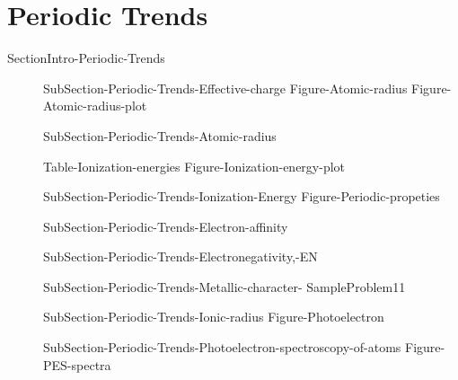 \documentclass[main.tex]{subfiles}
\begin{document}
\section{Periodic Trends}{SectionIntro-Periodic-Trends}
\sloppy
\begin{description}
\item[] {SubSection-Periodic-Trends-Effective-charge}
   {Figure-Atomic-radius}
{Figure-Atomic-radius-plot}

\item[] {SubSection-Periodic-Trends-Atomic-radius}

{Table-Ionization-energies}\newpage
{Figure-Ionization-energy-plot}
\item[] {SubSection-Periodic-Trends-Ionization-Energy}
  {Figure-Periodic-propeties}

\item[] {SubSection-Periodic-Trends-Electron-affinity}

 
\item[] {SubSection-Periodic-Trends-Electronegativity,-EN}
\item[]{SubSection-Periodic-Trends-Metallic-character-}
  {SampleProblem11}
\item[]  {SubSection-Periodic-Trends-Ionic-radius}
{Figure-Photoelectron}
\item[] {SubSection-Periodic-Trends-Photoelectron-spectroscopy-of-atoms}
{Figure-PES-spectra}
\end{description}


\newpage
\end{document}

